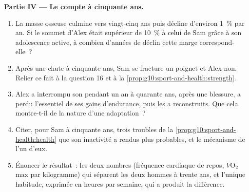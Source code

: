 \begin{problem}
\medskip
\noindent\textbf{Partie IV --- Le compte à cinquante ans.}
\begin{enumerate}[resume]
  \item La masse osseuse culmine vers vingt-cinq ans puis décline
        d'environ 1~\% par an. Si le sommet d'Alex était supérieur de
        10~\% à celui de Sam grâce à son adolescence active, à combien
        d'années de déclin cette marge correspond-elle~?
  \item Après une chute à cinquante ans, Sam se fracture un poignet et
        Alex non. Relier ce fait à la question 16 et à la
        \cref{prop:g10:sport-and-health:strength}.
  \item Alex a interrompu son  pendant un an à quarante
        ans, après une blessure, a perdu l'essentiel de ses gains
        d'endurance, puis les a reconstruits. Que cela montre-t-il de
        la nature d'une adaptation~?
  \item Citer, pour Sam à cinquante ans, trois troubles de la
        \cref{prop:g10:sport-and-health:health} que son inactivité a
        rendus plus probables, et le mécanisme de l'un d'eux.
  \item Énoncer le résultat~: les deux nombres (fréquence cardiaque de
        repos, $\dot V\!\mathrm{O_2}$max par kilogramme) qui séparent
        les deux hommes à trente ans, et l'unique habitude, exprimée en
        heures par semaine, qui a produit la différence.
\end{enumerate}
\end{problem}
